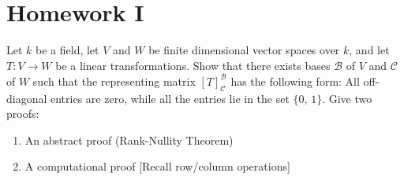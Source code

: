 \documentclass[crop=false,class=article]{standalone}                           %
\begin{document}
        \section{Homework I}
        \begin{problem}
            Let $k$ be a field, let $V$ and $W$ be finite dimensional vector
            spaces over $k$, and let $T:V\rightarrow{W}$ be a linear
            transformations. Show that there exists bases $\mathscr{B}$ of $V$
            and $\mathscr{C}$ of $W$ such that the representing matrix
            $[T]_{\mathscr{C}}^{\mathscr{B}}$ has the following form: All
            off-diagonal entries are zero, while all the entries lie in the set
            $\{0,\,1\}$. Give two proofs:
            \begin{enumerate}
                \item   An abstract proof (Rank-Nullity Theorem)
                \item   A computational proof [Recall row/column operations]
            \end{enumerate}
        \end{problem}
\end{document}
